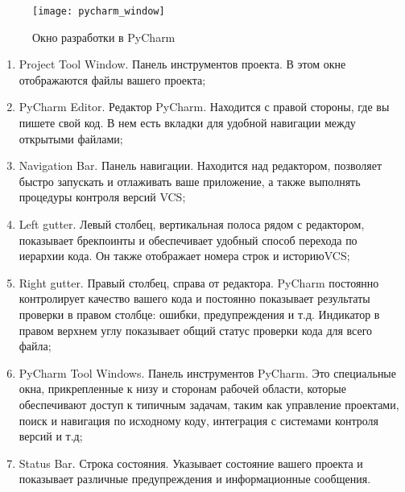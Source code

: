     \begin{figure}[ht]
        \centering
        \texttt{[image: pycharm\_window]}
        \caption{Окно разработки в PyCharm}
        \label{fig:pycharm_window}
    \end{figure}

    \begin{enumerate}
        \item Project Tool Window. Панель инструментов проекта. В этом окне отображаются файлы вашего проекта;
        \item PyCharm Editor. Редактор PyCharm. Находится с правой стороны, где вы пишете свой код. В нем есть вкладки для удобной навигации между открытыми файлами;
        \item Navigation Bar. Панель навигации. Находится над редактором, позволяет быстро запускать и отлаживать ваше приложение, а также выполнять процедуры контроля версий VCS;
        \item Left gutter. Левый столбец, вертикальная полоса рядом с редактором, показывает брекпоинты и обеспечивает удобный способ перехода по иерархии кода. Он также отображает номера строк и историюVCS;
        \item Right gutter. Правый столбец, справа от редактора. PyCharm постоянно контролирует качество вашего кода и постоянно показывает результаты проверки в правом столбце: ошибки, предупреждения и т.д. Индикатор в правом верхнем углу показывает общий статус проверки кода для всего файла;
        \item PyCharm Tool Windows. Панель инструментов PyCharm. Это специальные окна, прикрепленные к низу и сторонам рабочей области, которые обеспечивают доступ к типичным задачам, таким как управление проектами, поиск и навигация по исходному коду, интеграция с системами контроля версий и т.д;
        \item Status Bar. Строка состояния. Указывает состояние вашего проекта и показывает различные предупреждения и информационные сообщения.
    \end{enumerate}    

